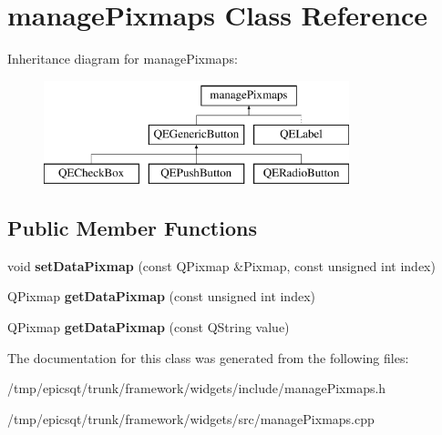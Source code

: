 \hypertarget{classmanagePixmaps}{
\section{managePixmaps Class Reference}
\label{classmanagePixmaps}
}
Inheritance diagram for managePixmaps:\begin{figure}[H]
\begin{center}
\leavevmode
\includegraphics[height=3.000000cm]{classmanagePixmaps}
\end{center}
\end{figure}
\subsection*{Public Member Functions}
\begin{DoxyCompactItemize}
\item 
\hypertarget{classmanagePixmaps_a49384115f677a14241dc477de0b8ac01}{
void {\bfseries setDataPixmap} (const QPixmap \&Pixmap, const unsigned int index)}
\label{classmanagePixmaps_a49384115f677a14241dc477de0b8ac01}

\item 
\hypertarget{classmanagePixmaps_a481ab0139363c76d1b93014c26201180}{
QPixmap {\bfseries getDataPixmap} (const unsigned int index)}
\label{classmanagePixmaps_a481ab0139363c76d1b93014c26201180}

\item 
\hypertarget{classmanagePixmaps_a870a168314c0d88d5430823dbb3578f7}{
QPixmap {\bfseries getDataPixmap} (const QString value)}
\label{classmanagePixmaps_a870a168314c0d88d5430823dbb3578f7}

\end{DoxyCompactItemize}


The documentation for this class was generated from the following files:\begin{DoxyCompactItemize}
\item 
/tmp/epicsqt/trunk/framework/widgets/include/managePixmaps.h\item 
/tmp/epicsqt/trunk/framework/widgets/src/managePixmaps.cpp\end{DoxyCompactItemize}
